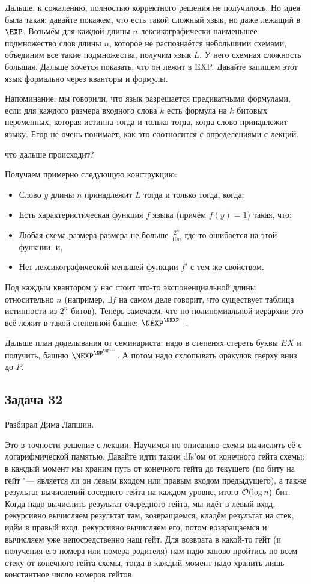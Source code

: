 	Дальше, к сожалению, полностью корректного решения не получилось.
	Но идея была такая: 
	давайте покажем, что есть такой сложный язык, но даже лежащий в $\EXP$.
	Возьмём для каждой длины $n$ лексикографически наименьшее подмножество слов длины $n$,
	которое не распознаётся небольшими схемами, объединим все такие подмножества, получим язык $L$.
	У него схемная сложность большая.
	Дальше хочется показать, что он лежит в EXP.
	Давайте запишем этот язык формально через кванторы и формулы.
	\begin{Rem}
		Напоминание: мы говорили, что язык разрешается предикатными формулами, если
		для каждого размера входного слова $k$ есть формула на $k$ битовых переменных,
		которая истинна тогда и только тогда, когда слово принадлежит языку.
		\TODO Егор не очень понимает, как это соотносится с определениями с лекций.
	\end{Rem}
	\TODO что дальше происходит?

	Получаем примерно следующую конструкцию:
	\begin{itemize}
		\item Слово $y$ длины $n$ принадлежит $L$ тогда и только тогда, когда:
		\item Есть характеристическая функция $f$ языка (причём $f(y)=1$) такая, что:
		\item Любая схема размера размера не больше $\frac{2^n}{10n}$ где-то ошибается на этой функции, и,
		\item Нет лексикографической меньшей функции $f'$ с тем же свойством.
	\end{itemize}
	Под каждым квантором у нас стоит что-то экспоненциальной длины относительно $n$ 
	(например, $\exists f$ на самом деле говорит, что существует таблица истинности из $2^n$ битов).
	Теперь замечаем, что по полиномиальной иерархии это всё лежит в такой степенной башне:
	$\NEXP^{\NEXP^{\dots}}$.
	
	Дальше план доделывания от семинариста: надо в степенях стереть буквы $EX$ и получить,
	башню $\NEXP^{\NP^{\NP^{\dots}}}$.
	А потом надо схлопывать оракулов сверху вниз до $P$.

\subsection{Задача 32}
	Разбирал Дима Лапшин.

	Это в точности решение с лекции.
	Научимся по описанию схемы вычислять её с логарифмической памятью.
	Давайте идти таким dfs'ом от конечного гейта схемы: в каждый момент
	мы храним путь от конечного гейта до текущего (по биту на гейт "---
	является ли он левым входом или правым входом предыдущего),
	а также результат вычислений соседнего гейта на каждом уровне, итого
	$\mathcal O(\log n)$ бит.
	Когда надо вычислить результат очередного гейта, мы идёт в левый вход,
	рекурсивно вычисляем результат там, возвращаемся, кладём результат на стек,
	идём в правый вход,	рекурсивно вычисляем его, потом возвращаемся и вычисляем
	уже непосредственно наш гейт.
	Для возврата в какой-то гейт (и получения его номера или номера родителя) нам
	надо заново пройтись по всем стеку от конечного гейта схемы, тогда в каждый
	момент надо хранить лишь константное число номеров гейтов.

